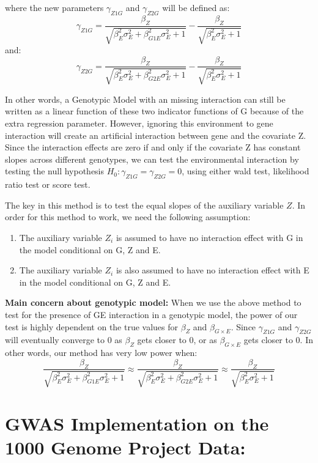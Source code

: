 \documentclass[
]{article}
\begin{document}
where the new parameters \(\gamma_{Z1G}\) and \(\gamma_{Z2G}\) will be
defined as:
\[\gamma_{Z1G} = \frac{\beta_Z}{\sqrt{\beta_E^2\sigma_E^2+\beta_{G1E}^2\sigma_E^2 +1}}-\frac{\beta_Z}{\sqrt{\beta_E^2\sigma_E^2 +1}} \]
and:
\[\gamma_{Z2G} = \frac{\beta_Z}{\sqrt{\beta_E^2\sigma_E^2+\beta_{G2E}^2\sigma_E^2 +1}}-\frac{\beta_Z}{\sqrt{\beta_E^2\sigma_E^2 +1}} \]

In other words, a Genotypic Model with an missing interaction can still
be written as a linear function of these two indicator functions of G
because of the extra regression parameter. However, ignoring this
environment to gene interaction will create an artificial interaction
between gene and the covariate Z. Since the interaction effects are zero
if and only if the covariate Z has constant slopes across different
genotypes, we can test the environmental interaction by testing the null
hypothesis \(H_0: \gamma_{Z1G} = \gamma_{Z2G} = 0\), using either wald
test, likelihood ratio test or score test.

The key in this method is to test the equal slopes of the auxiliary
variable \(Z\). In order for this method to work, we need the following
assumption:

\begin{enumerate}
\item The auxiliary variable $Z_i$ is assumed to have no interaction effect with G in the model conditional on G, Z and E.
\item The auxiliary variable $Z_i$ is also assumed to have no interaction effect with E in the model conditional on G, Z and E.
\end{enumerate}

\textbf{Main concern about genotypic model:} When we use the above
method to test for the presence of GE interaction in a genotypic model,
the power of our test is highly dependent on the true values for
\(\beta_Z\) and \(\beta_{G\times E}\). Since \(\gamma_{Z1G}\) and
\(\gamma_{Z2G}\) will eventually converge to \(0\) as \(\beta_Z\) gets
closer to \(0\), or as \(\beta_{G\times E}\) gets closer to \(0\). In
other words, our method has very low power when:
\[\frac{\beta_Z}{\sqrt{\beta_E^2\sigma_E^2+\beta_{G1E}^2\sigma_E^2 +1}} \approx \frac{\beta_Z}{\sqrt{\beta_E^2\sigma_E^2+\beta_{G2E}^2\sigma_E^2 +1}} \approx \frac{\beta_Z}{\sqrt{\beta_E^2\sigma_E^2+1}}\]

\hypertarget{gwas-implementation-on-the-1000-genome-project-data}{%
\section{GWAS Implementation on the 1000 Genome Project
Data:}\label{gwas-implementation-on-the-1000-genome-project-data}}
\end{document}
